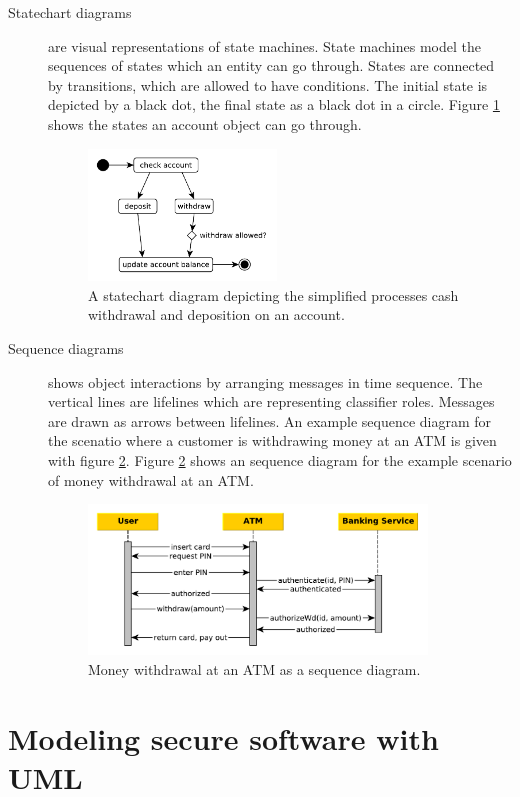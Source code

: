 \documentclass{acmtog} %
\begin{document}
\begin{description}
	\item[Statechart diagrams] are visual representations of state machines.
	State machines model the sequences of states which an entity can go through.
	States are connected by transitions, which are allowed to have conditions.
	The initial state is depicted by a black dot, the final state as a black dot in a circle.
	Figure \ref{fig:statechart-diagram} shows the states an account object can go through.
	\begin{figure}[ht]
		\centerline{\includegraphics[width=5cm]{img/uml-banking/statechart-diagram}}
		\caption{A statechart diagram depicting the simplified processes cash withdrawal and deposition on an account.}
		\label{fig:statechart-diagram}
	\end{figure}

	\item[Sequence diagrams] shows object interactions by arranging messages in time sequence.
	The vertical lines are lifelines which are representing classifier roles.
	Messages are drawn as arrows between lifelines.
	An example sequence diagram for the scenatio where a customer is withdrawing money at an ATM is given with figure \ref{fig:sequence-diagram}.
	Figure \ref{fig:sequence-diagram} shows an sequence diagram for the example scenario of money withdrawal at an ATM.
	\begin{figure}[ht]
		\centerline{\includegraphics[width=9cm]{img/uml-banking/sequence-diagram}}
		\caption{Money withdrawal at an ATM as a sequence diagram.}
		\label{fig:sequence-diagram}
	\end{figure}
\end{description}

\section{Modeling secure software with UML}
\label{sec:umlsec}
\end{document}
